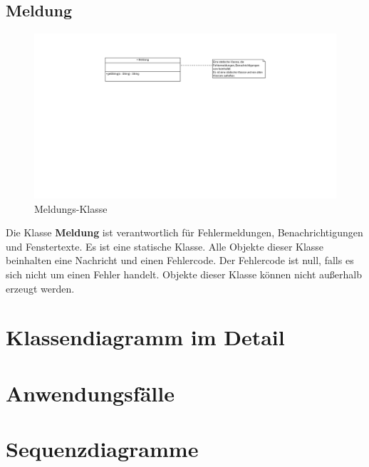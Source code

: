\documentclass[12pt,a4paper,titlepage]{article}
\newcommand{\myma}{\fontfamily{pcr}\selectfont \textbf}
\begin{document}
\newpage

\subsection{Meldung}
\begin{figure}[!ht]
\centering
\includegraphics[scale=0.8]{Meldung_Ausschnitt.png} \caption{Meldungs-Klasse} 
\end{figure}
Die Klasse {\myma{Meldung}} ist verantwortlich für Fehlermeldungen, Benachrichtigungen und Fenstertexte. Es ist eine statische Klasse. Alle Objekte dieser Klasse beinhalten eine Nachricht und einen Fehlercode. Der Fehlercode ist null, falls es sich nicht um einen Fehler handelt.
Objekte dieser Klasse können nicht außerhalb erzeugt werden.

\section{Klassendiagramm im Detail}

\section{Anwendungsfälle}



\section{Sequenzdiagramme}
\end{document}
